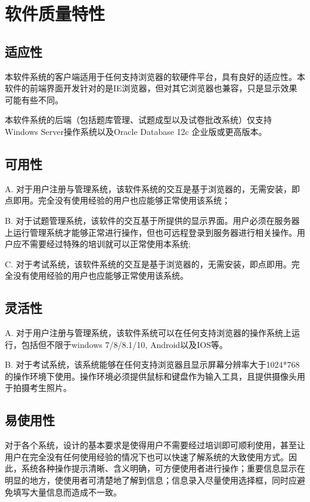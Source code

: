 \chapter{软件质量特性}

\section{适应性}

本软件系统的客户端适用于任何支持浏览器的软硬件平台，具有良好的适应性。本软件的前端界面开发针对的是IE浏览器，但对其它浏览器也兼容，只是显示效果可能有些不同。

本软件系统的后端（包括题库管理、试题成型以及试卷批改系统）仅支持Windows Server操作系统以及Oracle Database 12c 企业版或更高版本。

\section{可用性}
A. 对于用户注册与管理系统，该软件系统的交互是基于浏览器的，无需安装，即点即用。完全没有使用经验的用户也应能够正常使用该系统；

B. 对于试题管理系统，该软件的交互基于所提供的显示界面。用户必须在服务器上运行管理系统才能够正常进行操作，但也可远程登录到服务器进行相关操作。用户应不需要经过特殊的培训就可以正常使用本系统;

C. 对于考试系统，该软件系统的交互是基于浏览器的，无需安装，即点即用。完全没有使用经验的用户也应能够正常使用该系统。

\section{灵活性}
A. 对于用户注册与管理系统，该软件系统可以在任何支持浏览器的操作系统上运行，包括但不限于windows 7/8/8.1/10, Android以及IOS等。

B. 对于考试系统，该系统能够在任何支持浏览器且显示屏幕分辨率大于1024*768的操作环境下使用。操作环境必须提供鼠标和键盘作为输入工具，且提供摄像头用于拍摄考生照片。

\section{易使用性}
对于各个系统，设计的基本要求是使得用户不需要经过培训即可顺利使用，甚至让用户在完全没有任何使用经验的情况下也可以快速了解系统的大致使用方式。因此，系统各种操作提示清晰、含义明确，可方便使用者进行操作；重要信息显示在明显的地方，使使用者可清楚地了解到信息；信息录入尽量使用选择框，同时应避免填写大量信息而造成不一致。

